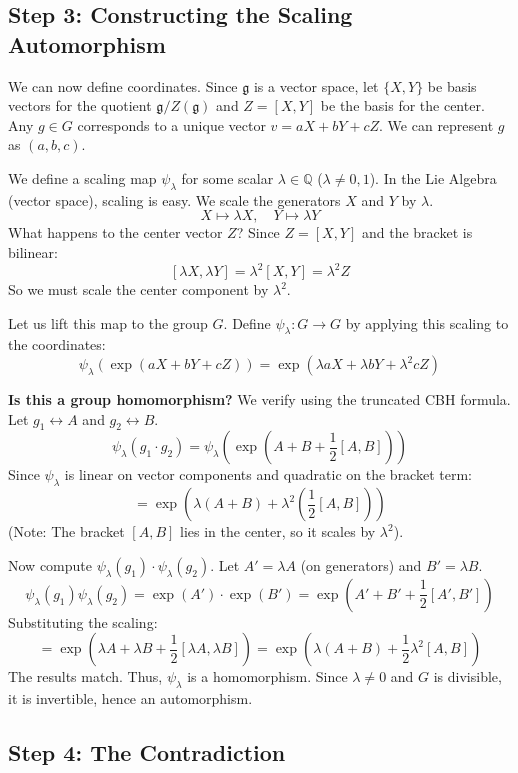 \documentclass{book}
\newcommand{\Q}{{\mathbb{Q}}}
\begin{document}
\subsection{Step 3: Constructing the Scaling Automorphism}

We can now define coordinates. Since $\mathfrak{g}$ is a vector space, let $\{X, Y\}$ be basis vectors for the quotient $\mathfrak{g}/Z(\mathfrak{g})$ and $Z = [X, Y]$ be the basis for the center.
Any $g \in G$ corresponds to a unique vector $v = aX + bY + cZ$. We can represent $g$ as $(a, b, c)$.

We define a scaling map $\psi_\lambda$ for some scalar $\lambda \in \Q$ ($\lambda \neq 0, 1$).
In the Lie Algebra (vector space), scaling is easy. We scale the generators $X$ and $Y$ by $\lambda$.
\[ X \mapsto \lambda X, \quad Y \mapsto \lambda Y \]
What happens to the center vector $Z$? Since $Z = [X, Y]$ and the bracket is bilinear:
\[ [\lambda X, \lambda Y] = \lambda^2 [X, Y] = \lambda^2 Z \]
So we must scale the center component by $\lambda^2$.

Let us lift this map to the group $G$. Define $\psi_\lambda: G \to G$ by applying this scaling to the coordinates:
\[ \psi_\lambda( \exp(aX + bY + cZ) ) = \exp( \lambda a X + \lambda b Y + \lambda^2 c Z ) \]

\textbf{Is this a group homomorphism?}
We verify using the truncated CBH formula. Let $g_1 \leftrightarrow A$ and $g_2 \leftrightarrow B$.
\[ \psi_\lambda(g_1 \cdot g_2) = \psi_\lambda(\exp(A + B + \frac{1}{2}[A, B])) \]
Since $\psi_\lambda$ is linear on vector components and quadratic on the bracket term:
\[ = \exp\left( \lambda(A+B) + \lambda^2 \left(\frac{1}{2}[A, B]\right) \right) \]
(Note: The bracket $[A, B]$ lies in the center, so it scales by $\lambda^2$).

Now compute $\psi_\lambda(g_1) \cdot \psi_\lambda(g_2)$. Let $A' = \lambda A$ (on generators) and $B' = \lambda B$.
\[ \psi_\lambda(g_1) \psi_\lambda(g_2) = \exp(A') \cdot \exp(B') = \exp\left( A' + B' + \frac{1}{2}[A', B'] \right) \]
Substituting the scaling:
\[ = \exp\left( \lambda A + \lambda B + \frac{1}{2}[\lambda A, \lambda B] \right) = \exp\left( \lambda(A+B) + \frac{1}{2}\lambda^2 [A, B] \right) \]
The results match. Thus, $\psi_\lambda$ is a homomorphism. Since $\lambda \neq 0$ and $G$ is divisible, it is invertible, hence an automorphism.

\subsection{Step 4: The Contradiction}
\end{document}

